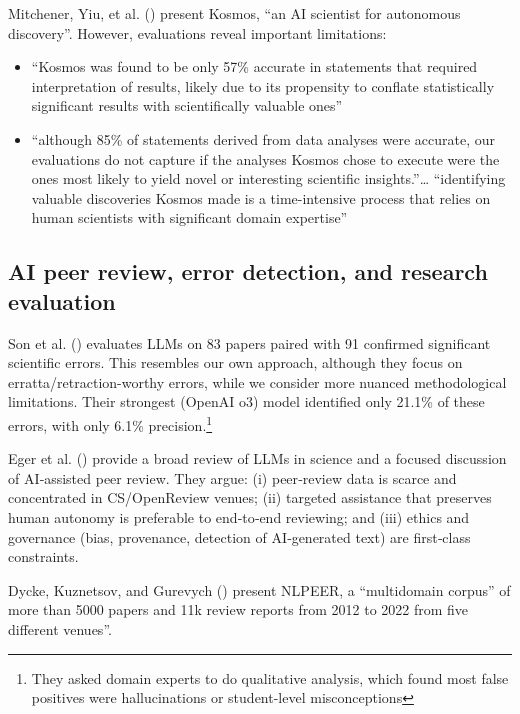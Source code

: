 \documentclass[
  11pt,
  letterpaper,
  DIV=11,
  numbers=noendperiod]{scrreprt}
\begin{document}
Mitchener, Yiu, et al. ()
present Kosmos, ``an AI scientist for autonomous discovery''. However,
evaluations reveal important limitations:

\begin{itemize}
\item
  ``Kosmos was found to be only 57\% accurate in statements that
  required interpretation of results, likely due to its propensity to
  conflate statistically significant results with scientifically
  valuable ones''
\item
  ``although 85\% of statements derived from data analyses were
  accurate, our evaluations do not capture if the analyses Kosmos chose
  to execute were the ones most likely to yield novel or interesting
  scientific insights.''\ldots{} ``identifying valuable discoveries
  Kosmos made is a time-intensive process that relies on human
  scientists with significant domain expertise''
\end{itemize}

\subsection{AI peer review, error detection, and research
evaluation}\label{ai-peer-review-error-detection-and-research-evaluation}

Son et al. () evaluates LLMs on 83
papers paired with 91 confirmed significant scientific errors. This
resembles our own approach, although they focus on
erratta/retraction-worthy errors, while we consider more nuanced
methodological limitations. Their strongest (OpenAI o3) model identified
only 21.1\% of these errors, with only 6.1\% precision.\footnote{They
  asked domain experts to do qualitative analysis, which found most
  false positives were hallucinations or student-level misconceptions}

Eger et al. () provide a broad review of
LLMs in science and a focused discussion of AI‑assisted peer review.
They argue: (i) peer‑review data is scarce and concentrated in
CS/OpenReview venues; (ii) targeted assistance that preserves human
autonomy is preferable to end‑to‑end reviewing; and (iii) ethics and
governance (bias, provenance, detection of AI‑generated text) are
first‑class constraints.

Dycke, Kuznetsov, and Gurevych () present
NLPEER, a ``multidomain corpus'' of more than 5000 papers and 11k review
reports from 2012 to 2022 from five different venues''.
\end{document}
